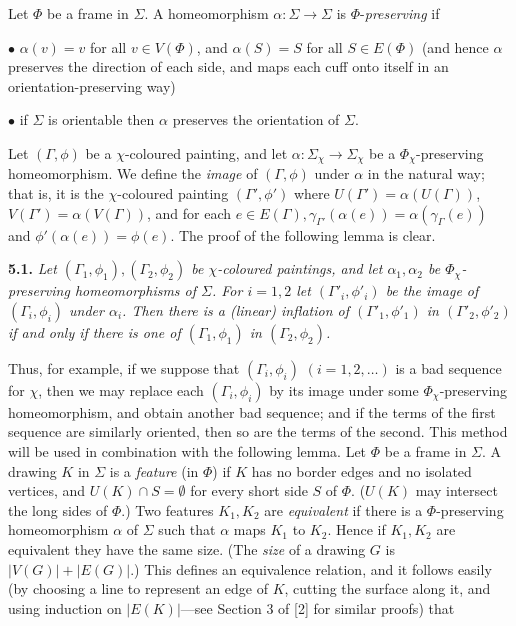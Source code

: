 
Let $\Phi$ be a frame in $\Sigma$. A homeomorphism $\alpha \colon \Sigma \to \Sigma$ is $\Phi$-\textit{preserving} if

\hspace*{12pt}$\bullet$ $\alpha(v) = v$ for all $v \in V(\Phi)$, and $\alpha(S) = S$ for all $S \in E(\Phi)$ (and hence $\alpha$ preserves the direction of each side, and maps each cuff onto itself in an orientation-preserving way)

\hspace*{12pt}$\bullet$ if $\Sigma$ is orientable then $\alpha$ preserves the orientation of $\Sigma$.

Let $(\Gamma, \phi)$ be a $\chi$-coloured painting, and let $\alpha \colon \Sigma_\chi \to \Sigma_\chi$ be a $\Phi_\chi$-preserving homeomorphism. We define the \textit{image} of $(\Gamma, \phi)$ under $\alpha$ in the natural way; that is, it is the $\chi$-coloured painting $(\Gamma', \phi')$ where $U(\Gamma') = \alpha(U(\Gamma))$, $V(\Gamma') = \alpha(V(\Gamma))$, and for each $e \in E(\Gamma), \gamma_{\Gamma'}(\alpha(e)) = \alpha(\gamma_\Gamma(e))$ and $\phi'(\alpha(e)) = \phi(e)$. The proof of the following lemma is clear.

\textbf{5.1.} \textit{Let $(\Gamma_1, \phi_1), (\Gamma_2, \phi_2)$ be $\chi$-coloured paintings, and let $\alpha_1, \alpha_2$ be $\Phi_\chi$-preserving homeomorphisms of $\Sigma$. For $i = 1, 2$ let $(\Gamma'_i, \phi'_i)$ be the image of $(\Gamma_i, \phi_i)$ under $\alpha_i$. Then there is a (linear) inflation of $(\Gamma'_1, \phi'_1)$ in $(\Gamma'_2, \phi'_2)$ if and only if there is one of $(\Gamma_1, \phi_1)$ in $(\Gamma_2, \phi_2)$.}

Thus, for example, if we suppose that $(\Gamma_i, \phi_i)$ $(i = 1, 2, \dots)$ is a bad sequence for $\chi$, then we may replace each $(\Gamma_i, \phi_i)$ by its image under some $\Phi_\chi$-preserving homeomorphism, and obtain another bad sequence; and if the terms of the first sequence are similarly oriented, then so are the terms of the second. This method will be used in combination with the following lemma. Let $\Phi$ be a frame in $\Sigma$. A drawing $K$ in $\Sigma$ is a \textit{feature} (in $\Phi$) if $K$ has no border edges and no isolated vertices, and $U(K) \cap S = \emptyset$ for every short side $S$ of $\Phi$. ($U(K)$ may intersect the long sides of $\Phi$.) Two features $K_1, K_2$ are \textit{equivalent} if there is a $\Phi$-preserving homeomorphism $\alpha$ of $\Sigma$ such that $\alpha$ maps $K_1$ to $K_2$. Hence if $K_1, K_2$ are equivalent they have the same size. (The \textit{size} of a drawing $G$ is $|V(G)| + |E(G)|$.) This defines an equivalence relation, and it follows easily (by choosing a line to represent an edge of $K$, cutting the surface along it, and using induction on $|E(K)|$---see Section 3 of [2] for similar proofs) that

